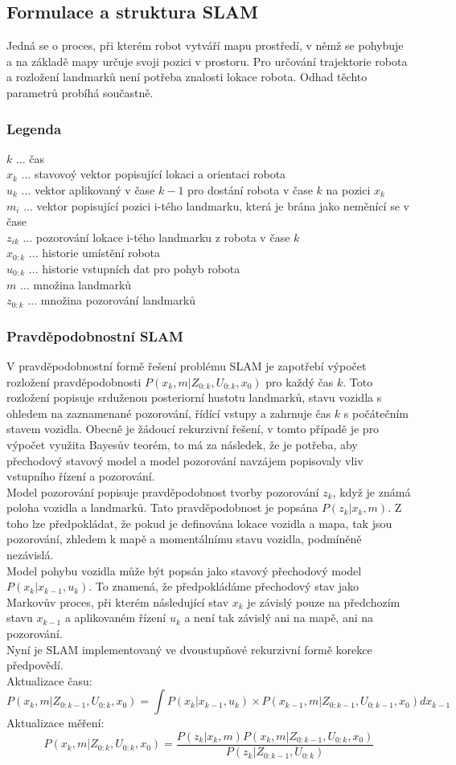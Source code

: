 \documentclass[11pt]{article}
\begin{document}
\subsection{Formulace a struktura SLAM} 
Jedná se o proces, při kterém robot vytváří mapu prostředí, v němž se pohybuje a na základě mapy určuje svoji pozici v prostoru. Pro určování trajektorie robota a rozložení landmarků není potřeba znalosti lokace robota. Odhad těchto parametrů probíhá součastně. 
\subsubsection{Legenda}
$k$ ... čas\\
$x_k$ ... stavovoý vektor popisující lokaci a orientaci robota\\ 
$u_k$ ... vektor aplikovaný v čase $k-1$ pro dostání robota v čase $k$ na pozici $x_k$\\
$m_i$ ... vektor popisující pozici i-tého landmarku, která je brána jako neměnící se v čase\\
$z_{ik}$ ... pozorování lokace i-tého landmarku z robota v čase $k$\\
$x_{0:k}$ ... historie umístění robota\\
$u_{0:k}$ ... historie vstupních dat pro pohyb robota\\
$m$ ... množina landmarků\\
$z_{0:k}$ ... množina pozorování landmarků
\subsubsection{Pravděpodobnostní SLAM}
V pravděpodobnostní formě řešení problému SLAM je zapotřebí výpočet rozložení pravděpodobnosti $P(x_k,m|Z_{0:k},U_{0:k},x_0)$ pro každý čas ${k}$. Toto rozložení popisuje srduženou posteriorní hustotu landmarků, stavu vozidla s ohledem na zaznamenané pozorování, řídící vstupy a zahrnuje čas ${k}$ s počátečním stavem vozidla. Obecně je žádoucí rekurzivní řešení, v tomto případě je pro výpočet využita Bayesův teorém, to má za následek, že je potřeba, aby přechodový stavový model a model pozorování navzájem popisovaly vliv vstupního řízení a pozorování.\\
\indent Model pozorování popisuje pravděpodobnost tvorby pozorování $z_k$, když je známá poloha vozidla a landmarků. Tato pravděpodobnost je popsána $P(z_k|x_k,m)$. Z toho lze předpokládat, že pokud je definována lokace vozidla a mapa, tak jsou pozorování, zhledem k mapě a momentálnímu stavu vozidla, podmíněně nezávislá. \\
Model pohybu vozidla může být popsán jako stavový přechodový model $P(x_k|x_{k-1},u_k)$. To znamená, že předpokládáme přechodový stav jako Markovův proces, při kterém následující stav $x_k$ je závislý pouze na předchozím stavu $x_{k-1}$ a aplikovaném řízení $u_k$ a není tak závislý ani na mapě, ani na pozorování.\\
\indent Nyní je SLAM implementovaný ve dvoustupňové rekurzivní formě korekce předpovědí. \\
Aktualizace času:
$$P(x_k,m|Z_{0:k-1},U_{0:k},x_0)=\int P(x_k|x_{k-1},u_k)\times P(x_{k-1},m|Z_{0:k-1},U_{0:k-1},x_0)dx_{k-1}$$ 
Aktualizace měření:
$$P(x_k,m|Z_{0:k},U_{0:k},x_0)=\frac{P(z_k|x_k,m)P(x_k,m|Z_{0:k-1},U_{0:k},x_0)}{P(z_k|Z_{0:k-1},U_{0:k})}$$
\end{document}
